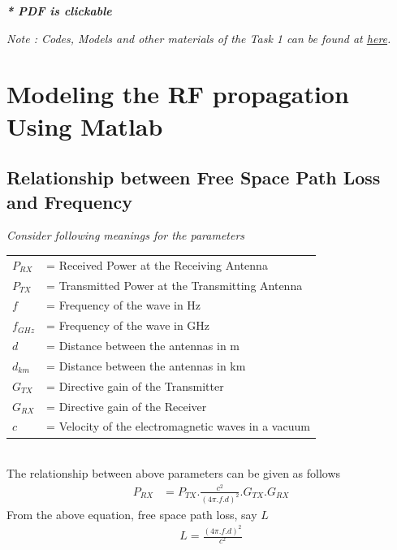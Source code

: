 \documentclass[a4paper,11pt]{article}%
\begin{document}

\tableofcontents

\begin{center}
	\textbf{\textit{* PDF is clickable}}
\end{center}

\textit{Note : Codes, Models and other materials of the Task 1 can be found at \href{https://github.com/bimalka98/RF-Propagation-Model}{here}.}
\pagebreak
\section{Modeling the RF propagation Using Matlab}
\subsection{Relationship between Free Space Path Loss and Frequency}

\textit{Consider  following meanings for the parameters}\\

\begin{tabular}{l l }
	$P_{RX}$ & = Received Power at the Receiving Antenna\\
	$P_{TX}$ & = Transmitted Power at the Transmitting Antenna\\
	$f$ & = Frequency of the wave in Hz\\
	$f_{GHz}$ & = Frequency of the wave in GHz\\
	$d$& = Distance between the antennas in m\\
	$d_{km}$& = Distance between the antennas in km\\
	$G_{TX}$& = Directive gain of the Transmitter\\
	$G_{RX}$& = Directive gain of the Receiver\\
	$c$& = Velocity of the electromagnetic waves in a vacuum\\

\end{tabular}\\[1cm]


The relationship between above parameters can be given as follows
\[
\begin{split}
P_{RX} & = P_{TX}.\frac{c^2}{(4\pi.f.d)^2}.G_{TX}.G_{RX}
\end{split}
\]
From the above equation, free space path loss, say $L$
\[
\begin{split}
L = \frac{(4\pi.f.d)^2}{c^2}
\end{split}
\]
\end{document}
